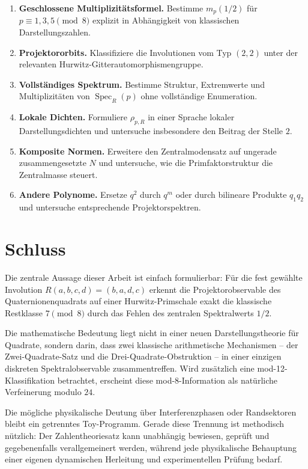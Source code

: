 \documentclass[11pt,a4paper]{article}
\theoremstyle{definition}
\newcommand{\Spec}{\operatorname{Spec}}
\begin{document}
\begin{enumerate}[label=\textbf{O\arabic*.}]
\item \textbf{Geschlossene Multiplizitätsformel.} Bestimme $m_p(1/2)$ für $p\equiv1,3,5\pmod8$ explizit in Abhängigkeit von klassischen Darstellungszahlen.
\item \textbf{Projektororbits.} Klassifiziere die Involutionen vom Typ $(2,2)$ unter der relevanten Hurwitz-Gitterautomorphismengruppe.
\item \textbf{Vollständiges Spektrum.} Bestimme Struktur, Extremwerte und Multiplizitäten von $\Spec_R(p)$ ohne vollständige Enumeration.
\item \textbf{Lokale Dichten.} Formuliere $\rho_{p,R}$ in einer Sprache lokaler Darstellungsdichten und untersuche insbesondere den Beitrag der Stelle $2$.
\item \textbf{Komposite Normen.} Erweitere den Zentralmodensatz auf ungerade zusammengesetzte $N$ und untersuche, wie die Primfaktorstruktur die Zentralmasse steuert.
\item \textbf{Andere Polynome.} Ersetze $q^2$ durch $q^m$ oder durch bilineare Produkte $q_1q_2$ und untersuche entsprechende Projektorspektren.
\end{enumerate}

\section{Schluss}
Die zentrale Aussage dieser Arbeit ist einfach formulierbar: Für die fest gewählte Involution $R(a,b,c,d)=(b,a,d,c)$ erkennt die Projektorobservable des Quaternionenquadrats auf einer Hurwitz-Primschale exakt die klassische Restklasse $7\pmod8$ durch das Fehlen des zentralen Spektralwerts $1/2$.

Die mathematische Bedeutung liegt nicht in einer neuen Darstellungstheorie für Quadrate, sondern darin, dass zwei klassische arithmetische Mechanismen -- der Zwei-Quadrate-Satz und die Drei-Quadrate-Obstruktion -- in einer einzigen diskreten Spektralobservable zusammentreffen. Wird zusätzlich eine mod-12-Klassifikation betrachtet, erscheint diese mod-8-Information als natürliche Verfeinerung modulo $24$.

Die mögliche physikalische Deutung über Interferenzphasen oder Randsektoren bleibt ein getrenntes Toy-Programm. Gerade diese Trennung ist methodisch nützlich: Der Zahlentheoriesatz kann unabhängig bewiesen, geprüft und gegebenenfalls verallgemeinert werden, während jede physikalische Behauptung einer eigenen dynamischen Herleitung und experimentellen Prüfung bedarf.
\end{document}
